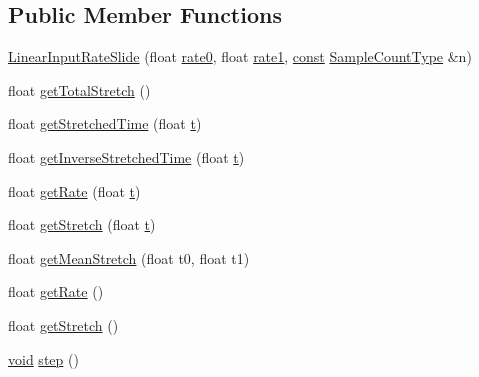 \subsection*{Public Member Functions}
\begin{DoxyCompactItemize}
\item 
\hyperlink{class__sbsms___1_1_linear_input_rate_slide_acf5e2d40e0547a22f00f2b0e2ada6188}{Linear\+Input\+Rate\+Slide} (float \hyperlink{class__sbsms___1_1_linear_input_rate_slide_a02082a8abed7e393a0422a065c938872}{rate0}, float \hyperlink{class__sbsms___1_1_linear_input_rate_slide_a540d2f109dd59741967459029dcf76a8}{rate1}, \hyperlink{getopt1_8c_a2c212835823e3c54a8ab6d95c652660e}{const} \hyperlink{namespace__sbsms___ae4ba47977e7e07f5945e529e2256b662}{Sample\+Count\+Type} \&n)
\item 
float \hyperlink{class__sbsms___1_1_linear_input_rate_slide_ad16db2eec30b6c5438b037acd6af2a91}{get\+Total\+Stretch} ()
\item 
float \hyperlink{class__sbsms___1_1_linear_input_rate_slide_a9de2c328e7cfdf4cdb1e7073f3bd5ead}{get\+Stretched\+Time} (float \hyperlink{octave__test_8m_aaccc9105df5383111407fd5b41255e23}{t})
\item 
float \hyperlink{class__sbsms___1_1_linear_input_rate_slide_aab7c245dd09b73c821197ed86271cf1d}{get\+Inverse\+Stretched\+Time} (float \hyperlink{octave__test_8m_aaccc9105df5383111407fd5b41255e23}{t})
\item 
float \hyperlink{class__sbsms___1_1_linear_input_rate_slide_ab61531ee0ef97fc932957592124e9abe}{get\+Rate} (float \hyperlink{octave__test_8m_aaccc9105df5383111407fd5b41255e23}{t})
\item 
float \hyperlink{class__sbsms___1_1_linear_input_rate_slide_aa40e633007f94528d96fb0db0b481d1d}{get\+Stretch} (float \hyperlink{octave__test_8m_aaccc9105df5383111407fd5b41255e23}{t})
\item 
float \hyperlink{class__sbsms___1_1_linear_input_rate_slide_a3fe2803974978de4db6daecd69b8d2c0}{get\+Mean\+Stretch} (float t0, float t1)
\item 
float \hyperlink{class__sbsms___1_1_linear_input_rate_slide_ac0df7a509d237b7eba8bf9a288ec1cc1}{get\+Rate} ()
\item 
float \hyperlink{class__sbsms___1_1_linear_input_rate_slide_a5f991b5ad1beecaddc36b584b247b7ae}{get\+Stretch} ()
\item 
\hyperlink{sound_8c_ae35f5844602719cf66324f4de2a658b3}{void} \hyperlink{class__sbsms___1_1_linear_input_rate_slide_aa347e5a4f938a2c163744203c1b696e3}{step} ()
\end{DoxyCompactItemize}
